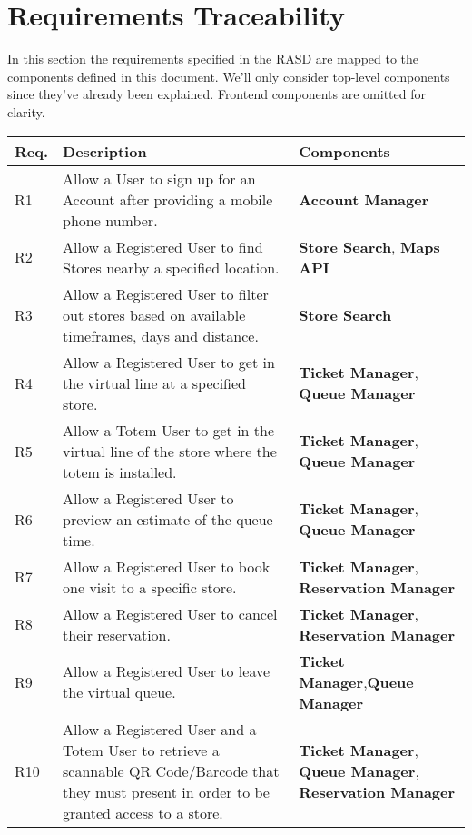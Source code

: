 
\section{Requirements Traceability}

In this section the requirements specified in the RASD are mapped to the components defined in this document. We'll only consider top-level components since they've already been explained. Frontend components are omitted for clarity.

\def\arraystretch{1.5}
\begin{longtable}{p{} p{} p{}}
    \textbf{Req.} & \textbf{Description} & \textbf{Components}\\
    \hline
    R1 & Allow a User to sign up for an Account after providing a mobile phone number. & \textbf{Account Manager}\\
    R2 & Allow a Registered User to find Stores nearby a specified location. & \textbf{Store Search}, \textbf{Maps API}\\
    R3 & Allow a Registered User to filter out stores based on available timeframes, days and distance. & \textbf{Store Search}\\
    R4 & Allow a Registered User to get in the virtual line at a specified store. & \textbf{Ticket Manager}, \textbf{Queue Manager}\\
    R5 & Allow a Totem User to get in the virtual line of the store where the totem is installed. & \textbf{Ticket Manager}, \textbf{Queue Manager}\\
    R6 & Allow a Registered User to preview an estimate of the queue time. & \textbf{Ticket Manager}, \textbf{Queue Manager}\\
    R7 & Allow a Registered User to book one visit to a specific store. & \textbf{Ticket Manager}, \textbf{Reservation Manager}\\
    R8 & Allow a Registered User to cancel their reservation. & \textbf{Ticket Manager}, \textbf{Reservation Manager}\\
    R9 & Allow a Registered User to leave the virtual queue. & \textbf{Ticket Manager},\textbf{Queue Manager}\\
    R10 & Allow a Registered User and a Totem User to retrieve a scannable QR Code/Barcode that they must present in order to be granted access to a store. & \textbf{Ticket Manager}, \textbf{Queue Manager}, \textbf{Reservation Manager}\\


\end{longtable}
